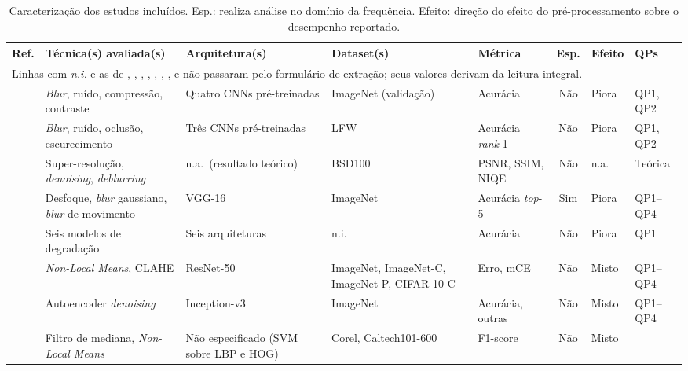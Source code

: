 \documentclass[conference]{IEEEtran}
\begin{document}
\begin{table}[htbp]
\caption{Caracterização dos estudos incluídos. Esp.: realiza análise no domínio da frequência. Efeito: direção do efeito do pré-processamento sobre o desempenho reportado.}
\begin{center}
\footnotesize
\setlength{\tabcolsep}{3pt}
\begin{tabular}{|c|p{3.1cm}|p{2.7cm}|p{3.1cm}|p{1.7cm}|c|p{1.4cm}|p{1.3cm}|}
\hline
\textbf{Ref.} & \textbf{Técnica(s) avaliada(s)} & \textbf{Arquitetura(s)} &
\textbf{Dataset(s)} & \textbf{Métrica} & \textbf{Esp.} & \textbf{Efeito} &
\textbf{QPs} \\
\hline
\multicolumn{8}{|l|}{\footnotesize Linhas com \emph{n.i.} e as de
\cite{b1}, \cite{b2}, \cite{b3}, \cite{b5}, \cite{b9}, \cite{b11},
\cite{b13}, \cite{b26} e \cite{b27} não passaram pelo formulário de extração;
seus valores derivam da leitura integral.} \\
\hline
\cite{b1} & \textit{Blur}, ruído, compressão, contraste & Quatro CNNs pré-treinadas &
ImageNet (validação) & Acurácia & Não & Piora & QP1, QP2 \\
\hline
\cite{b2} & \textit{Blur}, ruído, oclusão, escurecimento & Três CNNs pré-treinadas &
LFW & Acurácia \textit{rank}-1 & Não & Piora & QP1, QP2 \\
\hline
\cite{b3} & Super-resolução, \textit{denoising}, \textit{deblurring} &
n.a.\ (resultado teórico) & BSD100 & PSNR, SSIM, NIQE & Não & n.a. &
Teórica \\
\hline
\cite{b4} & Desfoque, \textit{blur} gaussiano, \textit{blur} de movimento & VGG-16 & ImageNet &
Acurácia \textit{top}-5 & Sim & Piora & QP1--QP4 \\
\hline
\cite{b5} & Seis modelos de degradação & Seis arquiteturas & n.i. & Acurácia &
Não & Piora & QP1 \\
\hline
\cite{b6} & \textit{Non-Local Means}, CLAHE & ResNet-50 & ImageNet, ImageNet-C, ImageNet-P, CIFAR-10-C
& Erro, mCE & Não & Misto & QP1--QP4 \\
\hline
\cite{b7} & Autoencoder \textit{denoising} & Inception-v3 & ImageNet &
Acurácia, outras & Não & Misto & QP1--QP4 \\
\hline
\cite{b8} & Filtro de mediana, \textit{Non-Local Means} & Não especificado
(SVM sobre LBP e HOG) & Corel, Caltech101-600 & F1-score & Não & Misto &

\end{tabular}
\end{center}
\end{table}
\end{document}
